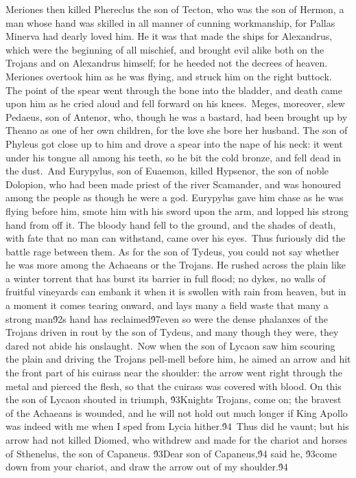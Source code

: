 {Meriones then killed Phereclus the son of Tecton, who was the son of Hermon, a man whose hand was skilled in all manner of cunning workmanship, for Pallas Minerva had dearly loved him. He it was that made the ships for Alexandrus, which were the beginning of all mischief, and brought evil alike both on the Trojans and on Alexandrus himself; for he heeded not the decrees of heaven. Meriones overtook him as he was flying, and struck him on the right buttock. The point of the spear went through the bone into the bladder, and death came upon him as he cried aloud and fell forward on his knees.\
Meges, moreover, slew Pedaeus, son of Antenor, who, though he was a bastard, had been brought up by Theano as one of her own children, for the love she bore her husband. The son of Phyleus got close up to him and drove a spear into the nape of his neck: it went under his tongue all among his teeth, so he bit the cold bronze, and fell dead in the dust.\
And Eurypylus, son of Euaemon, killed Hypsenor, the son of noble Dolopion, who had been made priest of the river Scamander, and was honoured among the people as though he were a god. Eurypylus gave him chase as he was flying before him, smote him with his sword upon the arm, and lopped his strong hand from off it. The bloody hand fell to the ground, and the shades of death, with fate that no man can withstand, came over his eyes.\
Thus furiously did the battle rage between them. As for the son of Tydeus, you could not say whether he was more among the Achaeans or the Trojans. He rushed across the plain like a winter torrent that has burst its barrier in full flood; no dykes, no walls of fruitful vineyards can embank it when it is swollen with rain from heaven, but in a moment it comes tearing onward, and lays many a field waste that many a strong man\'92s hand has reclaimed\'97even so were the dense phalanxes of the Trojans driven in rout by the son of Tydeus, and many though they were, they dared not abide his onslaught.\
Now when the son of Lycaon saw him scouring the plain and driving the Trojans pell-mell before him, he aimed an arrow and hit the front part of his cuirass near the shoulder: the arrow went right through the metal and pierced the flesh, so that the cuirass was covered with blood. On this the son of Lycaon shouted in triumph, \'93Knights Trojans, come on; the bravest of the Achaeans is wounded, and he will not hold out much longer if King Apollo was indeed with me when I sped from Lycia hither.\'94\
Thus did he vaunt; but his arrow had not killed Diomed, who withdrew and made for the chariot and horses of Sthenelus, the son of Capaneus. \'93Dear son of Capaneus,\'94 said he, \'93come down from your chariot, and draw the arrow out of my shoulder.\'94\
}
